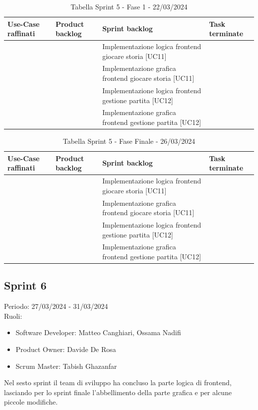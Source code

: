 \documentclass{article}
\begin{document}
\begin{table}[h]
    \centering
    \begin{tabularx}{\textwidth}{|X|X|X|X|}
        \hline
        \bf Use-Case raffinati & \bf Product backlog & \bf Sprint backlog & \bf Task terminate \\
        \hline
        & & Implementazione logica frontend giocare storia [UC11] & \\
        \hline
        & & Implementazione grafica frontend giocare storia [UC11] & \\
        \hline
        & & Implementazione logica frontend gestione partita [UC12] & \\
        \hline
        & & Implementazione grafica frontend gestione partita [UC12] & \\
        \hline
    \end{tabularx}
    \caption*{Tabella Sprint 5 - Fase 1 - 22/03/2024}
\end{table}

\begin{table}[h]
    \centering
    \begin{tabularx}{\textwidth}{|X|X|X|X|}
        \hline
        \bf Use-Case raffinati & \bf Product backlog & \bf Sprint backlog & \bf Task terminate \\
        \hline
        & & Implementazione logica frontend giocare storia [UC11] & \\
        \hline
        & & Implementazione grafica frontend giocare storia [UC11] & \\
        \hline
        & & Implementazione logica frontend gestione partita [UC12] & \\
        \hline
        & & Implementazione grafica frontend gestione partita [UC12] & \\
        \hline
    \end{tabularx}
    \caption*{Tabella Sprint 5 - Fase Finale - 26/03/2024}
\end{table}

\clearpage
\subsection*{Sprint 6}
Periodo: 27/03/2024 - 31/03/2024\vspace*{7pt}\\
Ruoli:
\begin{itemize}[label = { }]
    \itemsep0em
    \item Software Developer: Matteo Canghiari, Ossama Nadifi 
    \item Product Owner: Davide De Rosa
    \item Scrum Master: Tabish Ghazanfar
\end{itemize}
Nel sesto sprint il team di sviluppo ha concluso la parte logica di frontend, lasciando per lo sprint finale l’abbellimento della parte grafica e per alcune piccole modifiche.
\end{document}

